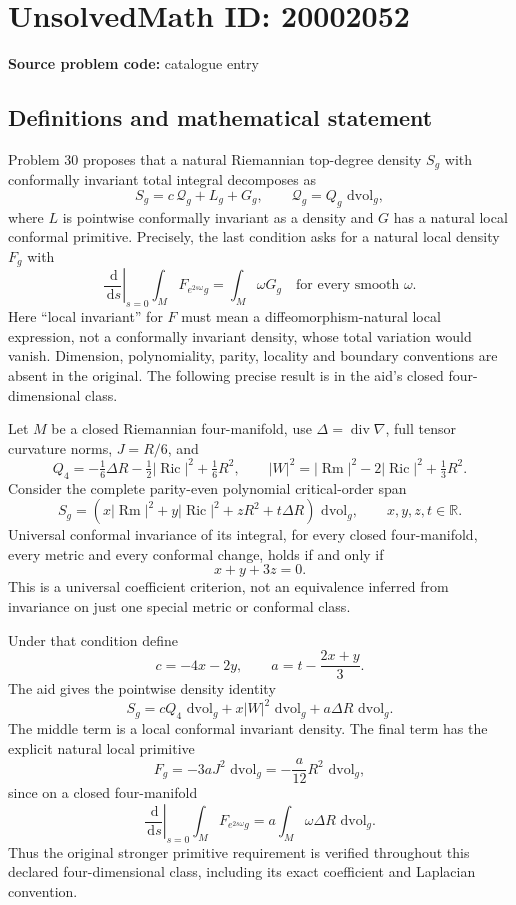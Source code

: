 \documentclass[11pt]{article}
\newcommand{\R}{\mathbb{R}}
\newcommand{\dd}{\,\mathrm{d}}
\begin{document}
\section*{UnsolvedMath ID: 20002052}
\textbf{Source problem code:} catalogue entry
\subsection{Definitions and mathematical statement}
Problem 30 proposes that a natural Riemannian top-degree density \(S_g\) with conformally invariant total integral decomposes as
\[
 S_g=c\,\mathcal Q_g+L_g+G_g,
 \qquad\mathcal Q_g=Q_g\,\dd\mathrm{vol}_g,
\]
where \(L\) is pointwise conformally invariant as a density and \(G\) has a natural local conformal primitive. Precisely, the last condition asks for a natural local density \(F_g\) with
\[
 \left.\frac{\dd}{\dd s}\right|_{s=0}
 \int_MF_{e^{2s\omega}g}=\int_M\omega G_g
 \quad\text{for every smooth }\omega.
\]
Here ``local invariant'' for \(F\) must mean a diffeomorphism-natural local expression, not a conformally invariant density, whose total variation would vanish. Dimension, polynomiality, parity, locality and boundary conventions are absent in the original. The following precise result is in the aid's closed four-dimensional class.

Let \(M\) be a closed Riemannian four-manifold, use \(\Delta=\operatorname{div}\nabla\), full tensor curvature norms, \(J=R/6\), and
\[
 Q_4=-\tfrac16\Delta R-\tfrac12|\operatorname{Ric}|^2+\tfrac16R^2,
 \qquad |W|^2=|\operatorname{Rm}|^2-2|\operatorname{Ric}|^2+\tfrac13R^2.
\]
Consider the complete parity-even polynomial critical-order span
\[
 S_g=(x|\operatorname{Rm}|^2+y|\operatorname{Ric}|^2
           +zR^2+t\Delta R)\,\dd\mathrm{vol}_g,
 \qquad x,y,z,t\in\R.
\]
Universal conformal invariance of its integral, for every closed four-manifold, every metric and every conformal change, holds if and only if
\[
 x+y+3z=0.
\]
This is a universal coefficient criterion, not an equivalence inferred from invariance on just one special metric or conformal class.

Under that condition define
\[
 c=-4x-2y,\qquad a=t-\frac{2x+y}{3}.
\]
The aid gives the pointwise density identity
\[
 S_g=cQ_4\,\dd\mathrm{vol}_g
       +x|W|^2\,\dd\mathrm{vol}_g
       +a\Delta R\,\dd\mathrm{vol}_g.
\]
The middle term is a local conformal invariant density. The final term has the explicit natural local primitive
\[
 F_g=-3aJ^2\,\dd\mathrm{vol}_g
     =-\frac a{12}R^2\,\dd\mathrm{vol}_g,
\]
since on a closed four-manifold
\[
 \left.\frac{\dd}{\dd s}\right|_{s=0}
 \int_MF_{e^{2s\omega}g}
 =a\int_M\omega\Delta R\,\dd\mathrm{vol}_g.
\]
Thus the original stronger primitive requirement is verified throughout this declared four-dimensional class, including its exact coefficient and Laplacian convention.
\end{document}
